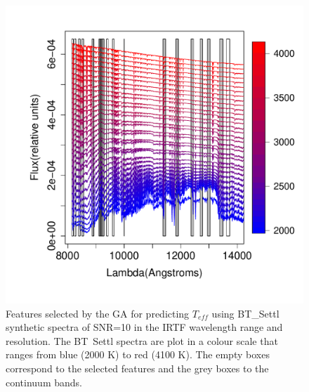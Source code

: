\begin {figure}
 \centering
  \includegraphics[scale=0.55]{figs/BT-spectraAtIRTF-10-teff}
  \caption{Features selected by the GA for predicting $T_{eff}$ using
    BT\_Settl synthetic spectra of SNR=10 in the IRTF wavelength range
    and resolution. The BT\ Settl spectra are plot in a colour scale
    that ranges from blue (2000 K) to red (4100 K). The empty boxes
    correspond to the selected features and the grey boxes to the
    continuum bands.}
\label{fig:irtf-teff}
\end {figure}

